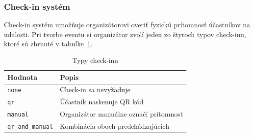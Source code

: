   \subsubsection{Check-in systém}

  Check-in systém umožňuje organizátorovi overiť fyzickú prítomnosť účastníkov
  na udalosti. Pri tvorbe eventu si organizátor zvolí jeden zo štyroch typov
  check-inu, ktoré sú zhrnuté v tabuľke~\ref{tab:checkin-types}.

  \begin{table}[h]
      \centering                                                                                                                                                                                                                   
      \caption{Typy check-inu}
      \label{tab:checkin-types}
      \begin{tabular}{ll}
          \toprule                                                                                                                                                                                                                 
          \textbf{Hodnota} & \textbf{Popis} \\                                                                                                                                                                                     
          \midrule                                                                                                                                                                                                                 
          \texttt{none}            & Check-in sa nevyžaduje \\                                                                                                                                                                     
          \texttt{qr}              & Účastník naskenuje QR kód \\                                                                                                                                                                  
          \texttt{manual}          & Organizátor manuálne označí prítomnosť \\                                                                                                                                                     
          \texttt{qr\_and\_manual} & Kombinácia oboch predchádzajúcich \\                                                                                                                                                          
          \bottomrule                                                                                                                                                                                                              
      \end{tabular}
  \end{table}

